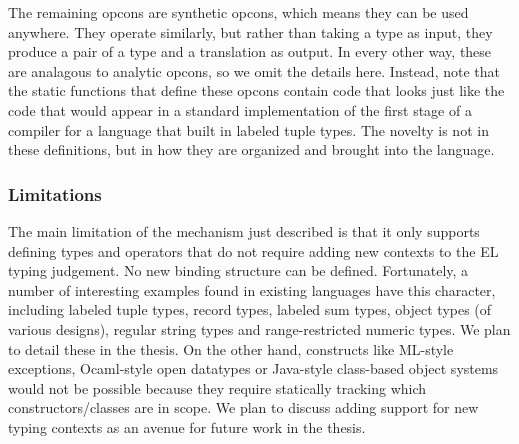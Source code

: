 
 
The remaining opcons are synthetic opcons, which means they can be used anywhere. They operate similarly, but rather than taking a type as input, they produce a pair of a type and a translation as output. In every other way, these are analagous to analytic opcons, so we omit the details here. Instead, note that the static functions that define these opcons contain code that looks just like the code that would appear in a standard implementation of the first stage of a compiler for a language that built in labeled tuple types. The novelty is not in these definitions, but in how they are organized and brought into the language.

\subsubsection{Limitations}
The main limitation of the mechanism just described is that it only supports defining types and operators that do not require adding new contexts to the EL typing judgement. No new binding structure can be defined. Fortunately, a number of interesting examples found in existing languages have this character, including labeled tuple types, record types, labeled sum types, object types (of various designs), regular string types and range-restricted numeric types. We plan to detail these in the thesis. On the other hand, constructs like ML-style exceptions, Ocaml-style open datatypes or Java-style class-based object systems would not be possible because they require statically tracking which constructors/classes are in scope. We plan to discuss adding support for new typing contexts as an avenue for future work in the thesis.

